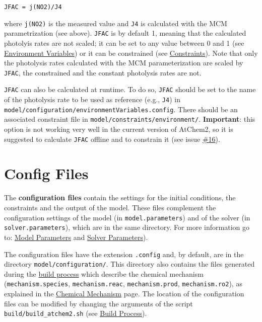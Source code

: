 \begin{verbatim}
JFAC = j(NO2)/J4
\end{verbatim}

where \texttt{j(NO2)} is the measured value and \texttt{J4} is
calculated with the MCM parametrization (see above). \texttt{JFAC} is
by default 1, meaning that the calculated photolyis rates are not
scaled; it can be set to any value between 0 and 1 (see
\hyperref[sec:environment-variables]{Environment Variables}) or it can be constrained
(see \hyperref[sec:constraints]{Constraints}). Note that only the
photolysis rates calculated with the MCM parameterization are scaled
by \texttt{JFAC}, the constrained and the constant photolysis rates
are not.

\texttt{JFAC} can also be calculated at runtime. To do so,
\texttt{JFAC} should be set to the name of the photolysis rate to be
used as reference (e.g., \texttt{J4}) in\\
\texttt{model/configuration/environmentVariables.config}. There should
be an associated constraint file in
\texttt{model/constraints/environment/}. \textbf{Important}: this
option is not working very well in the current version of AtChem2, so
it is suggested to calculate \texttt{JFAC} offline and to constrain it
(see issue \href{https://github.com/AtChem/AtChem2/issues/16}{\#16}).

\section{Config Files} \label{sec:config-files}

The \textbf{configuration files} contain the settings for the initial
conditions, the constraints and the output of the model. These files
complement the configuration settings of the model (in
\texttt{model.parameters}) and of the solver (in
\texttt{solver.parameters}), which are in the same directory. For more
information go to: \hyperref[sec:model-parameters]{Model Parameters} and
\hyperref[sec:solver-parameters]{Solver Parameters}).

The configuration files have the extension \texttt{.config} and, by
default, are in the directory \texttt{model/configuration/}. This
directory also contains the files generated during the
\hyperref[subsec:build-process]{build process} which describe the
chemical mechanism (\texttt{mechanism.species},
\texttt{mechanism.reac}, \texttt{mechanism.prod},
\texttt{mechanism.ro2}), as explained in the
\hyperref[sec:chemical-mechanism]{Chemical Mechanism} page. The location of the
configuration files can be modified by changing the arguments of the
script \texttt{build/build\_atchem2.sh} (see
\hyperref[subsec:build-process]{Build Process}).

